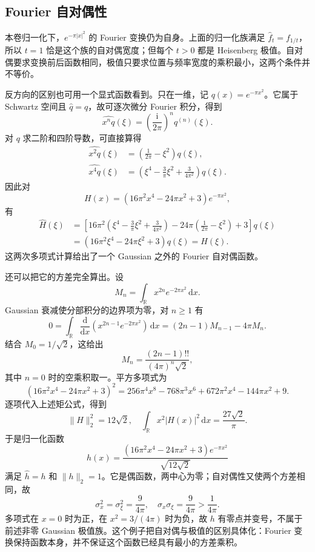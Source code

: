 \subsection{Fourier 自对偶性}
\label{b2:subsec:200203}

本卷归一化下，\(e^{-\pi|x|^2}\) 的 Fourier 变换仍为自身。上面的归一化族满足 \(\widehat f_t=f_{1/t}\)，所以 \(t=1\) 恰是这个族的自对偶宽度；但每个 \(t>0\) 都是 Heisenberg 极值。自对偶要求变换前后函数相同，极值只要求位置与频率宽度的乘积最小，这两个条件并不等价。

反方向的区别也可用一个显式函数看到。只在一维，记 \(q(x)=e^{-\pi x^2}\)。它属于 Schwartz 空间且 \(\widehat q=q\)，故可逐次微分 Fourier 积分，得到
\[
 \widehat{x^nq}(\xi)
 =\left(\frac{\mathrm i}{2\pi}\right)^n q^{(n)}(\xi).
\]
对 \(q\) 求二阶和四阶导数，可直接算得
\[
 \begin{aligned}
 \widehat{x^2q}(\xi)
 &=\left(\frac1{2\pi}-\xi^2\right)q(\xi),\\
 \widehat{x^4q}(\xi)
 &=\left(\xi^4-\frac3\pi\xi^2+\frac3{4\pi^2}\right)q(\xi).
 \end{aligned}
\]
因此对
\[
 H(x)=(16\pi^2x^4-24\pi x^2+3)e^{-\pi x^2},
\]
有
\[
 \begin{aligned}
 \widehat H(\xi)
 &=\left[
 16\pi^2\left(\xi^4-\frac3\pi\xi^2+\frac3{4\pi^2}\right)
 -24\pi\left(\frac1{2\pi}-\xi^2\right)+3
 \right]q(\xi)\\
 &=(16\pi^2\xi^4-24\pi\xi^2+3)q(\xi)=H(\xi).
 \end{aligned}
\]
这两次多项式计算给出了一个 Gaussian 之外的 Fourier 自对偶函数。

还可以把它的方差完全算出。设
\[
 M_n=\int_{\mathbb R}x^{2n}e^{-2\pi x^2}\,\mathrm dx.
\]
Gaussian 衰减使分部积分的边界项为零，对 \(n\geq1\) 有
\[
 0=\int_{\mathbb R}
 \frac{\mathrm d}{\mathrm dx}
 \left(x^{2n-1}e^{-2\pi x^2}\right)\,\mathrm dx
 =(2n-1)M_{n-1}-4\pi M_n.
\]
结合 \(M_0=1/\sqrt2\)，这给出
\[
 M_n=\frac{(2n-1)!!}{(4\pi)^n\sqrt2},
\]
其中 \(n=0\) 时的空乘积取一。平方多项式为
\[
 (16\pi^2x^4-24\pi x^2+3)^2
 =256\pi^4x^8-768\pi^3x^6
   +672\pi^2x^4-144\pi x^2+9.
\]
逐项代入上述矩公式，得到
\[
 \|H\|_2^2=12\sqrt2,
 \quad
 \int_{\mathbb R}x^2|H(x)|^2\,\mathrm dx
 =\frac{27\sqrt2}{\pi}.
\]
于是归一化函数
\begin{equation}\label{b2:eq:20-nongaussian-selfdual}
 h(x)=\frac{(16\pi^2x^4-24\pi x^2+3)e^{-\pi x^2}}
             {\sqrt{12\sqrt2}}
\end{equation}
满足 \(\widehat h=h\) 和 \(\|h\|_2=1\)。它是偶函数，两中心为零；自对偶性又使两个方差相同，故
\[
 \sigma_x^2=\sigma_\xi^2=\frac9{4\pi},
 \quad
 \sigma_x\sigma_\xi=\frac9{4\pi}>\frac1{4\pi}.
\]
多项式在 \(x=0\) 时为正，在 \(x^2=3/(4\pi)\) 时为负，故 \(h\) 有零点并变号，不属于前述非零 Gaussian 极值族。这个例子把自对偶与极值的区别具体化：Fourier 变换保持函数本身，并不保证这个函数已经具有最小的方差乘积。
